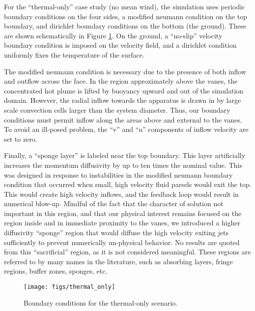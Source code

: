 %
%

For the ``thermal-only'' case study (no mean wind), the simulation
uses periodic boundary conditions on the four sides, a modified
neumann condition on the top boundary, and dirichlet boundary conditions
on the bottom (the ground). These are shown schematically in Figure
\ref{fig:thermalbc}. On the ground, a ``no-slip'' velocity boundary
condition is imposed on the velocity field, and a dirichlet condition
uniformly fixes the temperature of the surface. 

The modified neumann condition is necessary due to the presence of both
inflow and outflow across the face. In the region approximately above
the vanes, the concentrated hot plume is lifted by buoyancy
upward and out of the simulation domain. However, the radial inflow
towards the apparatus is drawn in by large scale convection cells larger
than the system diameter. Thus, our boundary conditions must permit
inflow along the areas above and external to the vanes. To avoid an
ill-posed problem, the ``v'' and ``u'' components of inflow velocity are
set to zero.  

Finally, a ``sponge layer'' is labeled near the top boundary. 
This layer
artificially increases the momentum diffusivity by up to ten times the nominal
value. This was designed in response to instabilities in the modified
neumann boundary condition that occurred when small, high velocity fluid
parsels would exit the top. This would create high velocity inflows, and
the feedback loop would result in numerical blow-up. Mindful of the fact
that the character of solution not important in this region, and that
our physical interest remains focused on the region inside and
in immediate proximity to the vanes, we introduced a higher diffusivity
``sponge'' region that would diffuse the high velocity exiting jets
sufficiently to prevent numerically un-physical behavior. No results are
quoted from this ``sacrificial'' region, as it is not considered
meaningful. These regions are referred to by many names in the
literature\cite{doi:10.1146/annurev.fluid.36.050802.121930}, such as
absorbing layers, fringe regions, buffer zones, sponges, etc.

\begin{figure}[!htb]
  \begin{center}
    \texttt{[image: figs/thermal\_only]}
    \caption{Boundary conditions for the thermal-only scenario. }
    \label{fig:thermalbc}
  \end{center}
\end{figure}

